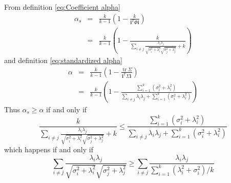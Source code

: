 \documentclass{article}
\makeatletter
\theoremstyle{plain}
\theoremstyle{plain}
\theoremstyle{definition}
\theoremstyle{remark}
\theoremstyle{definition}
\theoremstyle{plain}
\theoremstyle{plain}
\theoremstyle{definition}
\newenvironment{proof}[1][\protect\proofname]{\par
	\normalfont\topsep6\p@\@plus6\p@\relax
	\trivlist
	\itemindent\parindent
	\item[\hskip\labelsep\scshape #1]\ignorespaces
}{%
	\endtrivlist\@endpefalse
}
\providecommand{\proofname}{Proof}
\DeclareMathOperator{\tr}{tr}
\makeatother
\begin{document}
\begin{proof}
From definition \eqref{eq:Coefficient alpha}
\begin{eqnarray*}
\alpha_{s} & = & \frac{k}{k-1}\left(1-\frac{k}{\mathbf{i}^{T}\Phi\mathbf{i}}\right)\\
 & = & \frac{k}{k-1}\left(1-\frac{k}{\sum_{i\neq j}\frac{\lambda_{i}\lambda_{j}}{\sqrt{\sigma_{i}^{2}+\lambda_{i}^{2}}\sqrt{\sigma_{j}^{2}+\lambda_{j}^{2}}}+k}\right)
\end{eqnarray*}
and definition \eqref{eq:standardized alpha}
\begin{eqnarray*}
\alpha & = & \frac{k}{k-1}\left(1-\frac{\tr\Sigma}{\mathbf{i}^{T}\Sigma\mathbf{i}}\right)\\
 & = & \frac{k}{k-1}\left(1-\frac{\sum_{i=1}^{k}\left(\sigma_{i}^{2}+\lambda_{i}^{2}\right)}{\sum_{i\neq j}\lambda_{i}\lambda_{j}+\sum_{i=1}^{k}\left(\sigma_{i}^{2}+\lambda_{i}^{2}\right)}\right)
\end{eqnarray*}
Thus $\alpha_{s}\geq\alpha$ if and only if
\[
\frac{k}{\sum_{i\neq j}\frac{\lambda_{i}\lambda_{j}}{\sqrt{\sigma_{i}^{2}+\lambda_{i}^{2}}\sqrt{\sigma_{j}^{2}+\lambda_{j}^{2}}}+k}\leq\frac{\sum_{i=1}^{k}\left(\sigma_{i}^{2}+\lambda_{i}^{2}\right)}{\sum_{i\neq j}\lambda_{i}\lambda_{j}+\sum_{i=1}^{k}\left(\sigma_{i}^{2}+\lambda_{i}^{2}\right)}
\]
which happens if and only if 
\[
\sum_{i\neq j}\frac{\lambda_{i}\lambda_{j}}{\sqrt{\sigma_{i}^{2}+\lambda_{i}^{2}}\sqrt{\sigma_j^{2}+\lambda_{j}^{2}}}\geq\sum_{i\neq j}\frac{\lambda_{i}\lambda_{j}}{\sum_{i=1}^{k}\left(\lambda_{i}^{2}+\sigma_{i}^{2}\right)/k}
\]
\end{proof}
\end{document}
